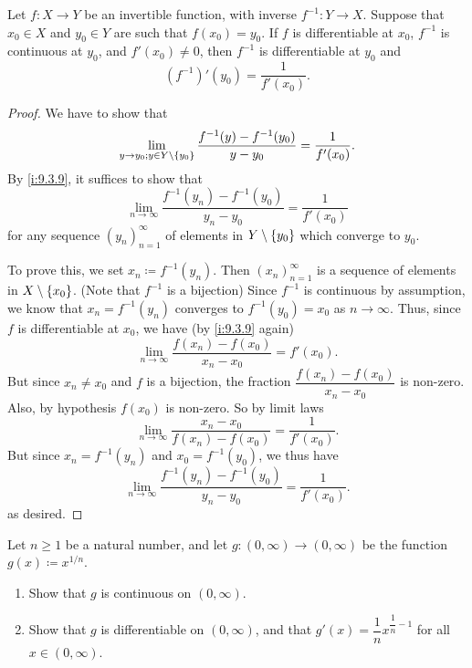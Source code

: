 \begin{thm}\label{i:10.4.2}
  Let \(f : X \to Y\) be an invertible function, with inverse \(f^{-1} : Y \to X\).
  Suppose that \(x_0 \in X\) and \(y_0 \in Y\) are such that \(f(x_0) = y_0\).
  If \(f\) is differentiable at \(x_0\), \(f^{-1}\) is continuous at \(y_0\), and \(f'(x_0 ) \neq 0\), then \(f^{-1}\) is differentiable at \(y_0\) and
  \[
    (f^{-1})'(y_0) = \dfrac{1}{f'(x_0)}.
  \]
\end{thm}

\begin{proof}
  We have to show that
  \[
    \lim_{y \to y_0 ; y \in Y \setminus \left\lbrace y_0\right\rbrace} \dfrac{f^{-1}(y) - f^{-1}(y_0)}{y - y_0} = \dfrac{1}{f'(x_0)}.
  \]
  By \cref{i:9.3.9}, it suffices to show that
  \[
    \lim_{n \to \infty} \dfrac{f^{-1}(y_n) - f^{-1}(y_0)}{y_n - y_0} = \dfrac{1}{f'(x_0)}
  \]
  for any sequence \((y_n)_{n = 1}^\infty\) of elements in \(Y \setminus \left\lbrace y_0\right\rbrace\) which converge to \(y_0\).

  To prove this, we set \(x_n \coloneqq f^{-1}(y_n)\).
  Then \((x_n)_{n = 1}^\infty\) is a sequence of elements in \(X \setminus \left\lbrace x_0\right\rbrace\).
  (Note that \(f^{-1}\) is a bijection)
  Since \(f^{-1}\) is continuous by assumption, we know that \(x_n = f^{-1}(y_n)\) converges to \(f^{-1}(y_0) = x_0\) as \(n \to \infty\).
  Thus, since \(f\) is differentiable at \(x_0\), we have (by \cref{i:9.3.9} again)
  \[
    \lim_{n \to \infty} \dfrac{f(x_n) - f(x_0)}{x_n - x_0} = f'(x_0).
  \]
  But since \(x_n \neq x_0\) and \(f\) is a bijection, the fraction \(\dfrac{f(x_n) - f(x_0)}{x_n - x_0}\) is non-zero.
  Also, by hypothesis \(f(x_0)\) is non-zero.
  So by limit laws
  \[
    \lim_{n \to \infty} \dfrac{x_n - x_0}{f(x_n) - f(x_0)} = \dfrac{1}{f'(x_0)}.
  \]
  But since \(x_n = f^{-1}(y_n)\) and \(x_0 = f^{-1}(y_0)\), we thus have
  \[
    \lim_{n \to \infty} \dfrac{f^{-1}(y_n) - f^{-1}(y_0)}{y_n - y_0} = \dfrac{1}{f'(x_0)}.
  \]
  as desired.
\end{proof}

\exercisesection

\begin{ex}\label{i:ex:10.4.1}
  Let \(n \geq 1\) be a natural number, and let \(g : (0, \infty) \to (0, \infty)\) be the function \(g(x) \coloneqq x^{1 / n}\).
  \begin{enumerate}
    \item Show that \(g\) is continuous on \((0, \infty)\).
    \item Show that \(g\) is differentiable on \((0, \infty)\), and that \(g'(x) = \dfrac{1}{n} x^{\dfrac{1}{n} - 1}\) for all \(x \in (0, \infty)\).
  \end{enumerate}
\end{ex}

